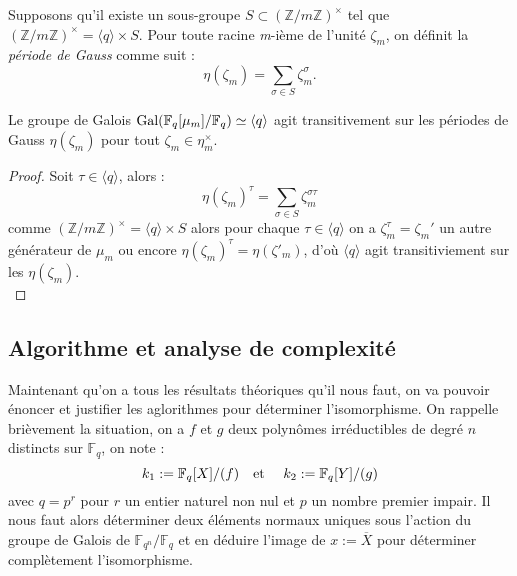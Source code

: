 \documentclass[a4paper]{article} %
\numberwithin{section}{part}
\numberwithin{equation}{section}
\newcommand\nroot[1]{\textit{#1}-ième}
\newcommand\zmodninv[1]{(\mathbb{Z}/#1\mathbb{Z})^{\times}}
\newcommand\GF[1]{\mathbb{F}_{#1}}
\newcommand\etmath{\textup{\quad et \quad}}
\begin{document}
\begin{defn}
Supposons qu'il existe un sous-groupe $S\subset\zmodninv{m}$ tel que
$\zmodninv{m} = \langle{q}\rangle\times S$. Pour toute racine \nroot{m} de
l'unité $\zeta_m$, on définit la \emph{période de Gauss} comme suit :
\begin{equation}
\eta(\zeta_m) = \sum_{\sigma\in S}{\zeta_m^{\sigma}}.
\end{equation}
\end{defn}
\begin{prop}
\label{prop:gaussperconj}
Le groupe de Galois $\textup{Gal}(\GF{q}[\mu_m]/\GF{q})\simeq\langle{q}\rangle$
agit transitivement sur les périodes de Gauss $\eta(\zeta_m)$ pour tout
$\zeta_m\in\eta_m^{\times}$.
\end{prop}
\begin{proof}
Soit $\tau\in\langle{q}\rangle$, alors :
\begin{equation}
\eta(\zeta_m)^{\tau} = \sum_{\sigma\in S}{\zeta_m^{\sigma\tau}}
\end{equation}
comme $\zmodninv{m} = \langle{q}\rangle\times S$ alors pour chaque
$\tau\in\langle{q}\rangle$ on a $\zeta_m^{\tau} = \zeta_m'$ un autre générateur
de $\mu_m$ ou encore $\eta(\zeta_m)^{\tau} = \eta(\zeta'_m)$, d'où
$\langle{q}\rangle$ agit transitiviement sur les $\eta(\zeta_m)$.\\
\end{proof}

\subsection{Algorithme et analyse de complexité}
\label{sec:algcompcycl}
Maintenant qu'on a tous les résultats théoriques qu'il nous faut, on va pouvoir
énoncer et justifier les aglorithmes pour déterminer l'isomorphisme. 
On rappelle brièvement la situation, on a $f$ et $g$ deux polynômes 
irréductibles de degré $n$ distincts sur $\GF{q}$, on note :
\[k_1 := \GF{q}[X]/(f)\etmath k_2 := \GF{q}[Y]/(g)\]
avec $q = p^r$ pour $r$ un entier naturel non nul et $p$ un nombre premier
impair. Il nous faut alors déterminer deux éléments normaux uniques sous
l'action du groupe de Galois de $\GF{q^n}/\GF{q}$ et en déduire l'image de $x :=
\overline{X}$ pour déterminer complètement l'isomorphisme. 
\end{document}

